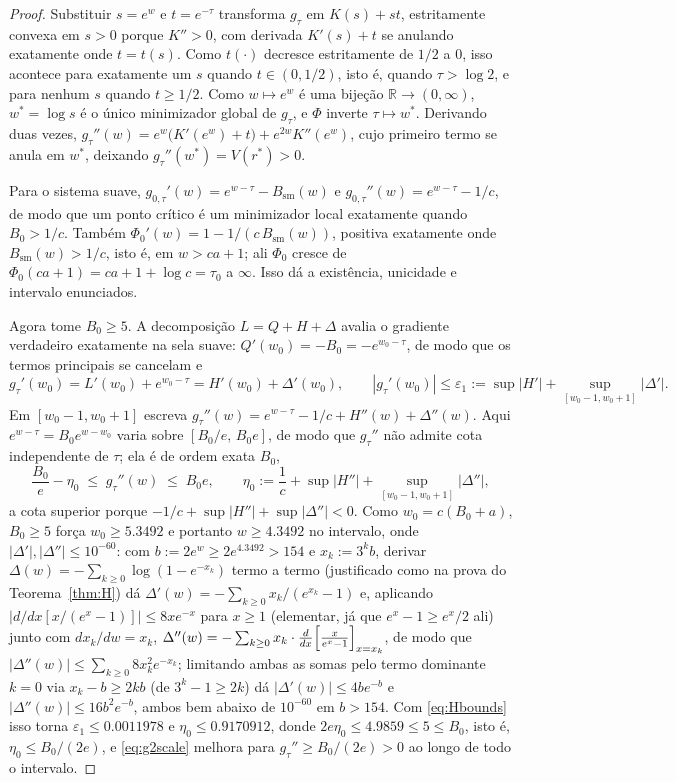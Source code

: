 \documentclass[11pt]{amsart}
\theoremstyle{plain}
\theoremstyle{definition}
\theoremstyle{remark}
\newcommand{\R}{\mathbb{R}}
\begin{document}
\begin{proof}
Substituir $s=e^w$ e $t=e^{-\tau}$ transforma $g_\tau$ em $K(s)+st$, estritamente convexa em $s>0$
porque $K''>0$, com derivada $K'(s)+t$ se anulando exatamente onde $t = t(s)$. Como $t(\cdot)$
decresce estritamente de $1/2$ a $0$, isso acontece para exatamente um $s$ quando $t\in(0,1/2)$,
isto é, quando $\tau>\log2$, e para nenhum $s$ quando $t\ge1/2$. Como $w\mapsto e^w$ é uma bijeção
$\R\to(0,\infty)$, $w^* = \log s$ é o único minimizador global de $g_\tau$, e $\Phi$ inverte
$\tau\mapsto w^*$. Derivando duas vezes, $g_\tau''(w) = e^w\bigl(K'(e^w)+t\bigr)+e^{2w}K''(e^w)$,
cujo primeiro termo se anula em $w^*$, deixando $g_\tau''(w^*) = V(r^*)>0$.

Para o sistema suave, $g_{0,\tau}'(w) = e^{w-\tau}-B_{\mathrm{sm}}(w)$ e $g_{0,\tau}''(w) =
e^{w-\tau}-1/c$, de modo que um ponto crítico é um minimizador local exatamente quando $B_0 > 1/c$.
Também $\Phi_0'(w) = 1-1/(c\,B_{\mathrm{sm}}(w))$, positiva exatamente onde
$B_{\mathrm{sm}}(w)>1/c$, isto é, em $w>ca+1$; ali $\Phi_0$ cresce de $\Phi_0(ca+1) = ca+1+\log c =
\tau_0$ a $\infty$. Isso dá a existência, unicidade e intervalo enunciados.

Agora tome $B_0\ge5$. A decomposição $L = Q+H+\Delta$ avalia o gradiente verdadeiro exatamente na
sela suave: $Q'(w_0) = -B_0 = -e^{w_0-\tau}$, de modo que os termos principais se cancelam e
\begin{equation}
\label{eq:gradatw0}
g_\tau'(w_0) = L'(w_0)+e^{w_0-\tau} = H'(w_0)+\Delta'(w_0), \qquad
|g_\tau'(w_0)| \le \varepsilon_1 := \sup|H'|+\sup_{[w_0-1,w_0+1]}|\Delta'| .
\end{equation}
Em $[w_0-1,w_0+1]$ escreva $g_\tau''(w) = e^{w-\tau}-1/c+H''(w)+\Delta''(w)$. Aqui $e^{w-\tau} =
B_0e^{w-w_0}$ varia sobre $[B_0/e,\,B_0e]$, de modo que $g_\tau''$ não admite cota independente de
$\tau$; ela é de ordem exata $B_0$,
\begin{equation}
\label{eq:g2scale}
\frac{B_0}{e}-\eta_0 \;\le\; g_\tau''(w) \;\le\; B_0e, \qquad
\eta_0 := \frac1c+\sup|H''|+\sup_{[w_0-1,w_0+1]}|\Delta''|,
\end{equation}
a cota superior porque $-1/c+\sup|H''|+\sup|\Delta''|<0$. Como $w_0 = c(B_0+a)$, $B_0\ge5$ força
$w_0\ge5.3492$ e portanto $w\ge4.3492$ no intervalo, onde $|\Delta'|,|\Delta''|\le10^{-60}$: com
$b:=2e^w\ge2e^{4.3492}>154$ e $x_k:=3^kb$, derivar $\Delta(w)=-\sum_{k\ge0}\log(1-e^{-x_k})$ termo
a termo (justificado como na prova do Teorema~\ref{thm:H}) dá $\Delta'(w) =
-\sum_{k\ge0}x_k/(e^{x_k}-1)$ e, aplicando $|d/dx[x/(e^x-1)]|\le8xe^{-x}$ para $x\ge1$ (elementar,
já que $e^x-1\ge e^x/2$ ali) junto com $dx_k/dw=x_k$, $\Delta''(w) = -\sum_{k\ge0}x_k\cdot
\frac{d}{dx}\Bigl[\frac{x}{e^x-1}\Bigr]_{x=x_k}$, de modo que
$|\Delta''(w)|\le\sum_{k\ge0}8x_k^2e^{-x_k}$; limitando ambas as somas pelo termo dominante $k=0$
via $x_k-b\ge2kb$ (de $3^k-1\ge2k$) dá $|\Delta'(w)|\le4be^{-b}$ e $|\Delta''(w)|\le16b^2e^{-b}$,
ambos bem abaixo de $10^{-60}$ em $b>154$. Com \eqref{eq:Hbounds} isso torna
$\varepsilon_1 \le 0.0011978$ e $\eta_0 \le 0.9170912$, donde $2e\eta_0 \le 4.9859 \le 5 \le B_0$,
isto é, $\eta_0 \le B_0/(2e)$, e \eqref{eq:g2scale} melhora para $g_\tau''\ge B_0/(2e)>0$ ao longo
de todo o intervalo.


\end{proof}
\end{document}
